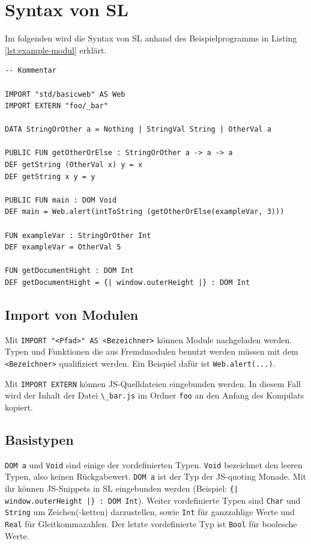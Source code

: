 \documentclass[12pt,bibtotoc]{scrreprt}
\begin{document}
\section{Syntax von SL}

Im folgenden wird die Syntax von SL anhand des Beispielprogramms in Listing \ref{lst:example-modul} erklärt.

\begin{lstlisting}[caption=Beispielmodul, label=lst:example-modul, float=h]
-- Kommentar

IMPORT "std/basicweb" AS Web
IMPORT EXTERN "foo/_bar"

DATA StringOrOther a = Nothing | StringVal String | OtherVal a

PUBLIC FUN getOtherOrElse : StringOrOther a -> a -> a
DEF getString (OtherVal x) y = x
DEF getString x y = y

PUBLIC FUN main : DOM Void
DEF main = Web.alert(intToString (getOtherOrElse(exampleVar, 3)))

FUN exampleVar : StringOrOther Int
DEF exampleVar = OtherVal 5

FUN getDocumentHight : DOM Int
DEF getDocumentHight = {| window.outerHeight |} : DOM Int

\end{lstlisting}

\subsection{Import von Modulen}

Mit \lstinline!IMPORT "<Pfad>" AS <Bezeichner>! können Module nachgeladen werden. Typen und Funktionen die aus Fremdmodulen benutzt werden müssen mit dem \lstinline!<Bezeichner>! qualifiziert werden. Ein Beispiel dafür ist \lstinline!Web.alert(...)!. 
  
  Mit \lstinline!IMPORT EXTERN! können \ac{JS}-Quelldateien eingebunden werden. In diesem Fall wird der Inhalt der Datei \lstinline!\_bar.js! im Ordner \lstinline!foo! an den Anfang des Kompilats kopiert.

\subsection{Basistypen}

\lstinline!DOM a! und \lstinline!Void! sind einige der vordefinierten Typen. \lstinline!Void! bezeichnet den leeren Typen, also keinen Rückgabewert. \lstinline!DOM a! ist der Typ der JS-quoting Monade. Mit ihr können JS-Snippets in SL eingebunden werden (Beispiel: \lstinline!{| window.outerHeight |} : DOM Int!). Weiter vordefinierte Typen sind \lstinline!Char! und \lstinline!String! um Zeichen(-ketten) darzustellen, sowie \lstinline!Int! für ganzzahlige Werte und \lstinline!Real! für Gleitkommazahlen. Der letzte vordefinierte Typ ist \lstinline!Bool! für boolesche Werte.
  
\end{document}
